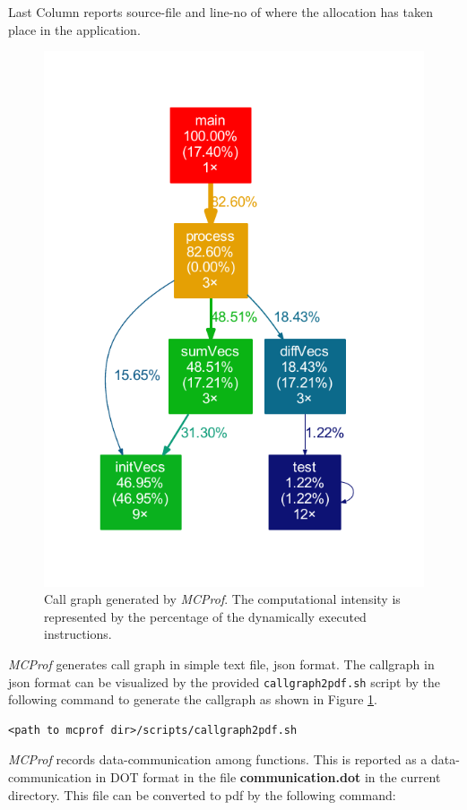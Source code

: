 \documentclass[10pt]{article}
\newcommand{\MCPROF}{\emph{MCProf}}
\begin{document}
Last Column reports source-file and line-no of where the allocation has taken
place in the application.

\begin{figure}[!h]
\centering
\includegraphics[width=0.75\linewidth]{figures/callgraph.pdf}
\caption{Call graph generated by \MCPROF{}. The computational intensity is
    represented by the percentage of the dynamically executed instructions.}
\label{fig:callgraph}
\end{figure}

\MCPROF{} generates call graph in simple text file, json format. The callgraph
in json format can be visualized by the provided \verb|callgraph2pdf.sh| script
by the following command to generate the callgraph as shown in
Figure \ref{fig:callgraph}.

{
\small
\begin{Verbatim}[frame=single]
<path to mcprof dir>/scripts/callgraph2pdf.sh
\end{Verbatim}
}

\MCPROF{} records data-communication among functions. This is reported as a
data-communication in DOT format in the file \textbf{communication.dot} in the
current directory. This file can be converted to pdf by the following command:
\end{document}
